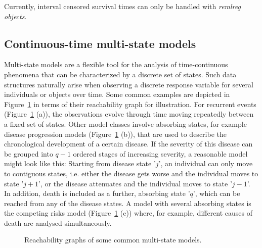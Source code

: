 \documentclass[11pt,a4paper,twoside]{bayesxarticle}
\begin{document}
Currently, interval censored survival times can only be handled with
{\em remlreg objects}.

\subsection{Continuous-time multi-state models}\label{msmodels}

Multi-state models are a flexible tool for the analysis of
time-continuous phenomena that can be characterized by a discrete
set of states. Such data structures naturally arise when observing a
discrete response variable for several individuals or objects over
time. Some common examples are depicted in Figure~\ref{some_msms} in
terms of their reachability graph for illustration. For recurrent
events (Figure~\ref{some_msms} (a)), the observations evolve through
time moving repeatedly between a fixed set of states. Other model
classes involve absorbing states, for example disease progression
models (Figure~\ref{some_msms} (b)), that are used to describe the
chronological development of a certain disease. If the severity of
this disease can be grouped into $q-1$ ordered stages of increasing
severity, a reasonable model might look like this: Starting from
disease state '$j$', an individual can only move to contiguous
states, i.e. either the disease gets worse and the individual moves
to state '$j+1$', or the disease attenuates and the individual moves
to state '$j-1$'. In addition, death is included as a further,
absorbing state '$q$', which can be reached from any of the disease
states. A model with several absorbing states is the competing risks
model (Figure~\ref{some_msms} (c)) where, for example, different
causes of death are analysed simultaneously.

\begin{figure}
\begin{center}
 
 \caption{Reachability graphs of some common multi-state
 models.\label{some_msms}}
\end{center}
\end{figure}
\end{document}
